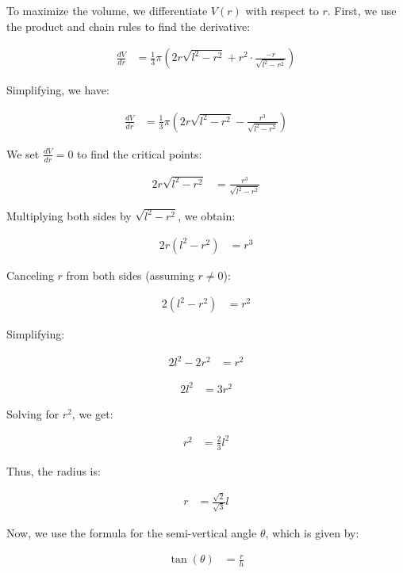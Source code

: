 \documentclass[journal]{IEEEtran}
\begin{document}
To maximize the volume, we differentiate \( V(r) \) with respect to \( r \). First, we use the product and chain rules to find the derivative:

\begin{align}
\frac{dV}{dr} &= \frac{1}{3} \pi \left( 2r \sqrt{l^2 - r^2} + r^2 \cdot \frac{-r}{\sqrt{l^2 - r^2}} \right)
\end{align}

Simplifying, we have:

\begin{align}
\frac{dV}{dr} &= \frac{1}{3} \pi \left( 2r \sqrt{l^2 - r^2} - \frac{r^3}{\sqrt{l^2 - r^2}} \right)
\end{align}

We set \( \frac{dV}{dr} = 0 \) to find the critical points:

\begin{align}
2r \sqrt{l^2 - r^2} &= \frac{r^3}{\sqrt{l^2 - r^2}}
\end{align}

Multiplying both sides by \( \sqrt{l^2 - r^2} \), we obtain:

\begin{align}
2r (l^2 - r^2) &= r^3
\end{align}

Canceling \( r \) from both sides (assuming \( r \neq 0 \)):

\begin{align}
2(l^2 - r^2) &= r^2
\end{align}

Simplifying:

\begin{align}
2l^2 - 2r^2 &= r^2
\end{align}

\begin{align}
2l^2 &= 3r^2
\end{align}

Solving for \( r^2 \), we get:

\begin{align}
r^2 &= \frac{2}{3} l^2
\end{align}

Thus, the radius is:

\begin{align}
r &= \frac{\sqrt{2}}{\sqrt{3}} l
\end{align}

Now, we use the formula for the semi-vertical angle \( \theta \), which is given by:

\begin{align}
\tan(\theta) &= \frac{r}{h}
\end{align}
\end{document}

